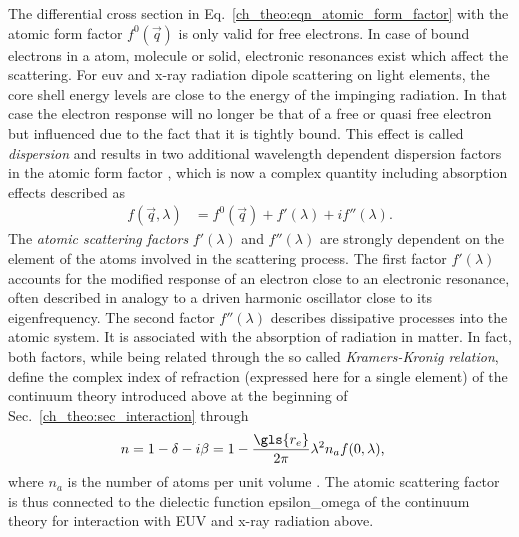 The differential cross section in Eq.~\eqref{ch_theo:eqn_atomic_form_factor} with the atomic form factor $f^{0}(\vec{q})$ is only valid for free electrons. In case of bound electrons in a atom, molecule or solid, electronic resonances exist which affect the scattering. For \gls{euv} and x-ray radiation dipole scattering on light elements, the core shell energy levels are close to the energy of the impinging radiation. In that case the electron response will no longer be that of a free or quasi free electron but influenced due to the fact that it is tightly bound. This effect is called \emph{dispersion} and results in two additional wavelength dependent dispersion factors in the atomic form factor \cite{als-nielsen_x-rays_2011, daillant_x-ray_2009}, which is now a complex quantity including absorption effects described as
\begin{align}
 f(\vec{q}, \lambda) &= f^0(\vec{q}) + f'(\lambda) + i f''(\lambda) \text{.} \label{ch_theo:eqn_dispersion_correction}
\end{align}
The \emph{atomic scattering factors} $f'(\lambda)$ and $f''(\lambda)$ are strongly dependent on the element of the atoms involved in the scattering process. The first factor $f'(\lambda)$ accounts for the modified response of an electron close to an electronic resonance, often described in analogy to a driven harmonic oscillator close to its eigenfrequency. The second factor $f''(\lambda)$ describes dissipative processes into the atomic system. It is associated with the absorption of radiation in matter. In fact, both factors, while being related through the so called \emph{Kramers-Kronig relation}, define the complex index of refraction (expressed here for a single element) of the continuum theory introduced above at the beginning of Sec.~\ref{ch_theo:sec_interaction} through
\begin{align}
n &= 1 - \delta - i \beta = 1 - \frac{\gls{r_e}}{2 \pi} \lambda^2 n_a f(0, \lambda) \text{,}
\end{align}
where $n_a$ is the number of atoms per unit volume \cite{thompson_x-ray_2001}. The atomic scattering factor is thus connected to the dielectic function \gls{epsilon_omega} of the continuum theory for interaction with EUV and x-ray radiation above.

